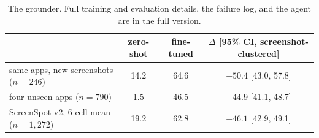 \documentclass[11pt]{article}
\begin{document}
\begin{table}[H]
\centering\small
\begin{tabular}{lccc}
\toprule
& zero-shot & fine-tuned & $\Delta$ [95\% CI, screenshot-clustered] \\
\midrule
same apps, new screenshots ($n{=}246$) & 14.2 & 64.6 & $+50.4$ [43.0, 57.8] \\
four unseen apps ($n{=}790$) & 1.5 & 46.5 & $+44.9$ [41.1, 48.7] \\
ScreenSpot-v2, 6-cell mean ($n{=}1{,}272$) & 19.2 & 62.8 & $+46.1$ [42.9, 49.1] \\
\bottomrule
\end{tabular}
\caption{The grounder. Full training and evaluation details, the failure log, and the agent are in the
full version.}
\end{table}
\end{document}
